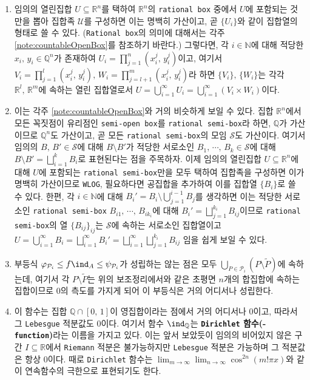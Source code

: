 \begin{enumerate}[label = \textsf{\textbf{\arabic*}}]
    \item 임의의 열린집합 $U\subseteq\mathbb{R}^n$를 택하여 $\mathbb{R}^n$의 \texttt{rational box} 중에서 $U$에 포함되는 것만을 뽑아 집합족 $\mathcal{U}$를 구성하면 이는 명백히 가산이고, 곧 $\{U_i\}$와 같이 집합열의 형태로 쓸 수 있다. (\texttt{Rational box}의 의미에 대해서는 각주 \ref{note:countableOpenBox}를 참조하기 바란다.) 그렇다면, 각 $i\in\mathbb{N}$에 대해 적당한 $x_i,\,y_i\in\mathbb{Q}^n$가 존재하여 $U_i=\prod_{j=1}^n(x_i^j,\,y_i^j)$이고, 여기서 $V_i=\prod_{j=1}^l(x_i^j,\,y_i^j),\,W_i=\prod_{j=l+1}^m(x_i^j,\,y_i^j)$라 하면 $\{V_i\},\,\{W_i\}$는 각각 $\mathbb{R}^l,\,\mathbb{R}^m$에 속하는 열린 집합열로서 $U=\bigcup_{i=1}^\infty U_i=\bigcup_{i=1}^\infty(V_i\times W_i)$이다.
    \item 이는 각주 \ref{note:countableOpenBox}와 거의 비슷하게 보일 수 있다. 집합 $\mathbb{R}^n$에서 모든 꼭짓점이 유리점인 \texttt{semi-open box}를 \texttt{rational semi-box}라 하면, $\mathbb{Q}$가 가산이므로 $\mathbb{Q}^n$도 가산이고, 곧 모든 \texttt{rational semi-box}의 모임 $\mathcal{S}$도 가산이다. 여기서 임의의 $B,\,B'\in\mathcal{S}$에 대해 $B\setminus B'$가 적당한 서로소인 $B_1,\,\cdots,\,B_k\in\mathcal{S}$에 대해 $B\setminus B'=\bigsqcup_{i=1}^kB_i$로 표현된다는 점을 주목하자. 이제 임의의 열린집합 $U\subseteq\mathbb{R}^n$에 대해 $U$에 포함되는 \texttt{rational semi-box}만을 모두 택하여 집합족을 구성하면 이가 명백히 가산이므로 \texttt{WLOG}, 필요하다면 공집합을 추가하여 이를 집합열 $\{B_i\}$로 쓸 수 있다. 한편, 각 $i\in\mathbb{N}$에 대해 $B_i'=B_i\setminus\bigcup_{j=1}^{i-1}B_j$를 생각하면 이는 적당한 서로소인 \texttt{rational semi-box} $B_{i1},\,\cdots,\,B_{ik_i}$에 대해 $B_i'=\bigsqcup_{j=1}^{k_i}B_{ij}$이므로 \texttt{rational semi-box}의 열 $\{B_{ij}\}_{ij}$는 $\mathcal{S}$에 속하는 서로소인 집합열이고 $U=\bigcup_{i=1}^\infty B_i=\bigsqcup_{i=1}^\infty B_i'=\bigsqcup_{i=1}^\infty\bigsqcup_{j=1}^{k_i}B_{ij}$ 임을 쉽게 보일 수 있다.
    \item 부등식 $\varphi_{\mathcal{P}_i}\leq f\ind_A\leq\psi_{\mathcal{P}_i}$가 성립하는 않는 점은 모두 $\bigcup_{P\in\mathcal{P}_i}(P\setminus\widetilde{P})$에 속하는데, 여기서 각 $P\setminus\widetilde{P}$는 위의 보조정리에서와 같은 초평면 $n$개의 합집합에 속하는 집합이므로 0의 측도를 가지게 되어 이 부등식은 거의 어디서나 성립한다.
    \item 이 함수는 집합 $\mathbb{Q}\cap[0,\,1]$이 영집합이라는 점에서 거의 어디서나 0이고, 따라서 그 \texttt{Lebesgue} 적분값도 $0$이다. 여기서 함수 $\ind_\mathbb{Q}$는 \textbf{\texttt{Dirichlet} 함수(- \texttt{function})}라는 이름을 가지고 있다. 이는 앞서 보았듯이 임의의 비어있지 않은 구간 $I\subseteq\mathbb{R}$에서 \texttt{Riemann} 적분은 불가능하지만 \texttt{Lebesgue} 적분은 가능하며 그 적분값은 항상 $0$이다. 때로 \texttt{Dirichlet} 함수는 $\lim_{m\to\infty}\lim_{n\to\infty}\cos^{2n}(m!\pi x)$와 같이 연속함수의 극한으로 표현되기도 한다.

\end{enumerate}
